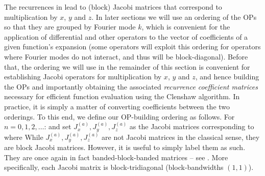 The recurrences in  lead to (block) Jacobi matrices that correspond to multiplication by $x$, $y$ and $z$. In later sections we will use an ordering of the OPs so that they are grouped by Fourier mode $k$, which is convenient for the application of differential and other operators to the vector of coefficients of a given function's expansion (some operators will exploit this ordering for operators where Fourier modes do not interact, and thus will be block-diagonal). Before that, the ordering we will use in the remainder of this section is convenient for establishing Jacobi operators for multiplication by $x$, $y$ and $z$, and hence building the OPs and importantly obtaining the associated \textit{recurrence coefficient matrices} necessary for efficient function evaluation using the Clenshaw algorithm. In practice, it is simply a matter of converting coefficients between the two orderings. To this end, we define our OP-building ordering as follows. For $n=0,1,2,\dots$:
and set $ J_x^{(a)},  J_y^{(a)},  J_z^{(a)}$ as the Jacobi matrices corresponding to
where
While $J_x^{(a)}, J_y^{(a)}, J_z^{(a)}$ are not Jacobi matrices in the classical sense, they are block Jacobi matrices. However, it is useful to simply label them as such. They are once again in fact banded-block-banded matrices -- see . More specifically, each Jacobi matrix is block-tridiagonal (block-bandwidths $(1,1)$). 

